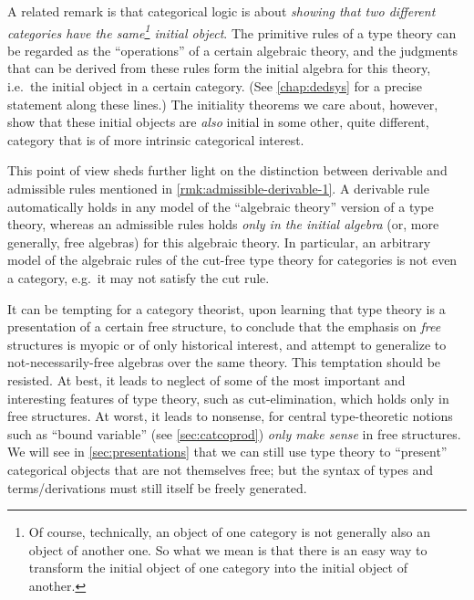 \documentclass{book}
\begin{document}
\label{sec:identifying-initial-objects}
A related remark is that categorical logic is about \emph{showing that two different categories have the same\footnote{Of course, technically, an object of one category is not generally also an object of another one.  So what we mean is that there is an easy way to transform the initial object of one category into the initial object of another.} initial object}.
The primitive rules of a type theory can be regarded as the ``operations'' of a certain algebraic theory, and the judgments that can be derived from these rules form the initial algebra for this theory, i.e.\ the initial object in a certain category.
(See \cref{chap:dedsys} for a precise statement along these lines.)
The initiality theorems we care about, however, show that these initial objects are \emph{also} initial in some other, quite different, category that is of more intrinsic categorical interest.

\begin{rmk}\label{rmk:admissible-derivable-2}\label{rmk:free}
  This point of view sheds further light on the distinction between derivable and admissible rules mentioned in \cref{rmk:admissible-derivable-1}.
  A derivable rule automatically holds in any model of the ``algebraic theory'' version of a type theory, whereas an admissible rules holds \emph{only in the initial algebra} (or, more generally, free algebras) for this algebraic theory.
  In particular, an arbitrary model of the algebraic rules of the cut-free type theory for categories is not even a category, e.g.\ it may not satisfy the cut rule.

  It can be tempting for a category theorist, upon learning that type theory is a presentation of a certain free structure, to conclude that the emphasis on \emph{free} structures is myopic or of only historical interest, and attempt to generalize to not-necessarily-free algebras over the same theory.
  This temptation should be resisted.
  At best, it leads to neglect of some of the most important and interesting features of type theory, such as cut-elimination, which holds only in free structures.
  At worst, it leads to nonsense, for central type-theoretic notions such as ``bound variable'' (see \cref{sec:catcoprod}) \emph{only make sense} in free structures.
  We will see in \cref{sec:presentations} that we can still use type theory to ``present'' categorical objects that are not themselves free; but the syntax of types and terms/derivations must still itself be freely generated.
\end{rmk}
\end{document}
